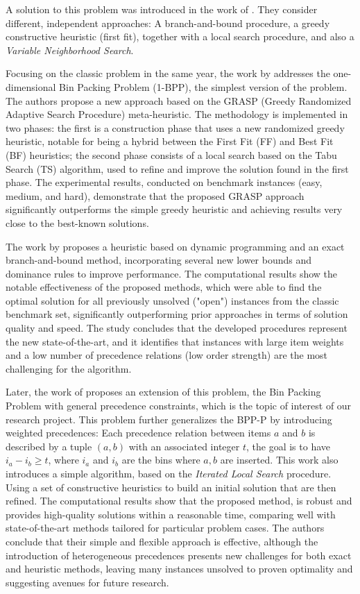 \documentclass[12pt]{article}
\begin{document}
 A solution to this problem was introduced in the work of \cite{dell2012bin}. They consider different, independent approaches: 
 A branch-and-bound procedure, a greedy constructive heuristic (first fit), together with a local search procedure, and also a 
 \textit{Variable Neighborhood Search}.

 Focusing on the classic problem in the same year, the work by \cite{layeb:12} addresses the one-dimensional Bin Packing Problem (1-BPP), 
 the simplest version of the problem. The authors propose a new approach based on the GRASP (Greedy Randomized Adaptive Search Procedure) 
 meta-heuristic. The methodology is implemented in two phases: the first is a construction phase that uses a new randomized greedy heuristic, 
 notable for being a hybrid between the First Fit (FF) and Best Fit (BF) heuristics; the second phase consists of a local search based on 
 the Tabu Search (TS) algorithm, used to refine and improve the solution found in the first phase. The experimental results, conducted on 
 benchmark instances (easy, medium, and hard), demonstrate that the proposed GRASP approach significantly outperforms the simple greedy 
 heuristic and achieving results very close to the best-known solutions.

The work by \cite{pereira:16} proposes a heuristic based on dynamic 
programming and an exact branch-and-bound method, incorporating several new lower bounds and dominance
rules to improve performance. The computational results show the notable effectiveness of the 
proposed methods, which were able to find the optimal solution for all previously unsolved ("open") 
instances from the classic benchmark set, significantly outperforming prior approaches in terms of 
solution quality and speed. The study concludes that the developed procedures represent the new 
state-of-the-art, and it identifies that instances with large item weights and a low number of 
precedence relations (low order strength) are the most challenging for the algorithm.

Later, the work of \cite{kramer:17} proposes an extension of this problem, the Bin Packing Problem with general precedence constraints, which is the topic of interest of our research project. This problem further generalizes the BPP-P by introducing weighted precedences: Each precedence relation between items \(a\) and \(b\) is described by a tuple \((a, b)\) with an associated integer \(t\), the goal is to have \(i_a - i_b \geq t\), where \(i_a\) and \(i_b\) are the bins where \(a, b\) are inserted. This work also introduces a simple algorithm, based on the \textit{Iterated Local Search} procedure. Using a set of constructive heuristics to build an initial solution that are then refined. The computational results show that the proposed method, is robust and provides high-quality solutions within a 
reasonable time, comparing well with state-of-the-art methods tailored for particular problem cases. The authors conclude that their simple and flexible approach is effective, although the introduction
of heterogeneous precedences presents new challenges for both exact and heuristic methods, 
leaving many instances unsolved to proven optimality and suggesting avenues for future research.
\end{document}
